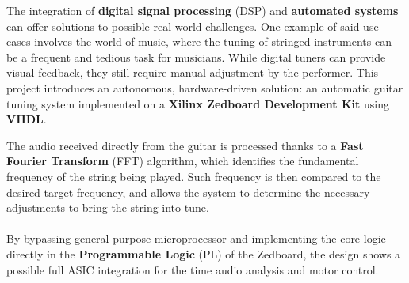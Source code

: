 The integration of \textbf{digital signal processing} (DSP) and \textbf{automated
systems} can offer solutions to possible real-world challenges.
One example of said use cases involves the world of music, where the tuning
of stringed instruments can be a frequent and tedious task for musicians.
While digital tuners can provide visual feedback, they still require manual adjustment
by the performer.
This project introduces an autonomous, hardware-driven solution: an automatic guitar
tuning system implemented on a \textbf{Xilinx Zedboard Development Kit} using \textbf{VHDL}.

The audio received directly from the guitar is processed thanks to a \textbf{Fast Fourier Transform} (FFT) algorithm,
which identifies the fundamental frequency of the string being played.
Such frequency is then compared to the desired target frequency, and allows the system to
determine the necessary adjustments to bring the string into tune.

\paragraph{}
By bypassing general-purpose microprocessor and implementing the core logic directly in the \textbf{Programmable Logic} (PL) of the Zedboard,
the design shows a possible full ASIC integration for the time audio analysis and motor control.
